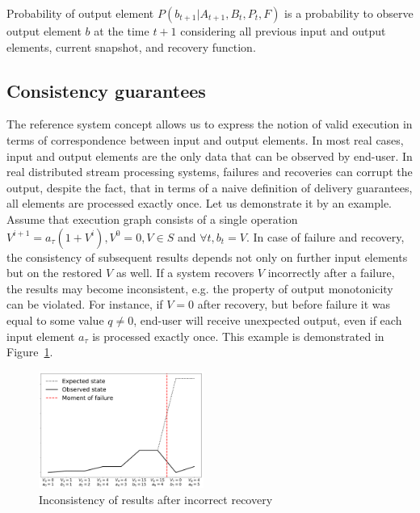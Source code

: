 \begin{definition}{Probability of output element}
$P(b_{t+1}|A_{t+1}, B_t, P_t,F)$ is a probability to observe output element $b$ at the time $t+1$ considering all previous input and output elements, current snapshot, and recovery function.
\end{definition}

\subsection{Consistency guarantees}

The reference system concept allows us to express the notion of valid execution in terms of correspondence between input and output elements. In most real cases, input and output elements are the only data that can be observed by end-user. In real distributed stream processing systems, failures and recoveries can corrupt the output, despite the fact, that in terms of a naive definition of delivery guarantees, all elements are processed exactly once. Let us demonstrate it by an example. Assume that execution graph consists of a single operation $V^{i+1}=a_\tau(1+V^{i}),V^{0}=0,V\in{S}$ and $\forall{t},b_t=V$. In case of failure and recovery, the consistency of subsequent results depends not only on further input elements but on the restored $V$ as well. If a system recovers $V$ incorrectly after a failure, the results may become inconsistent, e.g. the property of output monotonicity can be violated. For instance, if $V=0$ after recovery, but before failure it was equal to some value $q\neq{0}$, end-user will receive unexpected output, even if each input element $a_\tau$ is processed exactly once. This example is demonstrated in Figure~\ref{state-inconsistency}. 

\begin{figure}[htbp]
  \centering
  \includegraphics[width=0.48\textwidth]{pics/failure}
  \caption{Inconsistency of results after incorrect recovery}
  \label {state-inconsistency}
\end{figure}

